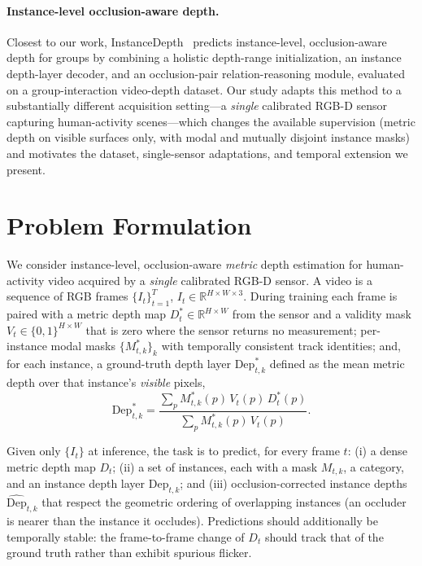 \documentclass[sigconf, review=true]{acmart}
\begin{document}

\paragraph{Instance-level occlusion-aware depth.}
Closest to our work, InstanceDepth~\cite{liang2025instancedepth} predicts
instance-level, occlusion-aware depth for groups by combining a holistic
depth-range initialization, an instance depth-layer decoder, and an
occlusion-pair relation-reasoning module, evaluated on a group-interaction
video-depth dataset. Our study adapts this method to a substantially different
acquisition setting---a \emph{single} calibrated RGB-D sensor capturing
human-activity scenes---which changes the available supervision (metric depth
on visible surfaces only, with modal and mutually disjoint instance masks) and
motivates the dataset, single-sensor adaptations, and temporal extension we
present.

\section{Problem Formulation}
\label{sec:problem}
We consider instance-level, occlusion-aware \emph{metric} depth estimation for
human-activity video acquired by a \emph{single} calibrated RGB-D sensor. A
video is a sequence of RGB frames $\{I_t\}_{t=1}^{T}$, $I_t\in\mathbb{R}^{H\times
W\times 3}$. During training each frame is paired with a metric depth map
$D^{*}_t\in\mathbb{R}^{H\times W}$ from the sensor and a validity mask
$V_t\in\{0,1\}^{H\times W}$ that is zero where the sensor returns no measurement;
per-instance modal masks $\{M^{*}_{t,k}\}_k$ with temporally consistent track
identities; and, for each instance, a ground-truth depth layer
$\mathrm{Dep}^{*}_{t,k}$ defined as the mean metric depth over that instance's
\emph{visible} pixels,
\begin{equation}
\label{eq:depthlayer}
\mathrm{Dep}^{*}_{t,k}=
\frac{\sum_{p} M^{*}_{t,k}(p)\,V_t(p)\,D^{*}_t(p)}
     {\sum_{p} M^{*}_{t,k}(p)\,V_t(p)}.
\end{equation}

Given only $\{I_t\}$ at inference, the task is to predict, for every frame $t$:
(i) a dense metric depth map $D_t$; (ii) a set of instances, each with a mask
$M_{t,k}$, a category, and an instance depth layer $\mathrm{Dep}_{t,k}$; and
(iii) occlusion-corrected instance depths $\hat{\mathrm{Dep}}_{t,k}$ that respect
the geometric ordering of overlapping instances (an occluder is nearer than the
instance it occludes). Predictions should additionally be temporally stable:
the frame-to-frame change of $D_t$ should track that of the ground truth rather
than exhibit spurious flicker.
\end{document}
